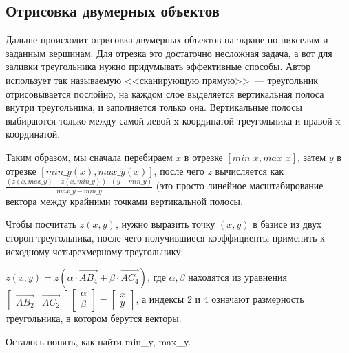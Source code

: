 \documentclass{article}
\begin{document}
\subsection{Отрисовка двумерных объектов}
Дальше происходит отрисовка двумерных объектов на экране по пикселям и заданным вершинам. Для отрезка это достаточно несложная задача, а вот для заливки треугольника нужно придумывать эффективные способы. Автор использует так называемую <<сканирующую прямую>>~--- треугольник отрисовывается послойно, на каждом слое выделяется вертикальная полоса внутри треугольника, и заполняется только она. Вертикальные полосы выбираются только между самой левой x-координатой треугольника и правой x-координатой.

Таким образом, мы сначала перебираем $x$ в отрезке $[min\_x, max\_x]$, затем $y$ в отрезке $[min\_y(x), max\_y(x)]$, после чего $z$ вычисляется как $\frac{(z(x, max\_y) - z(x, min\_y)) \cdot (y - min\_y)}{max\_y - min\_y}$ (это просто линейное масштабирование вектора между крайними точками вертикальной полосы.

Чтобы посчитать $z(x, y)$, нужно выразить точку $(x, y)$ в базисе из двух сторон треугольника, после чего получившиеся коэффициенты применить к исходному четырехмерному треугольнику:

$z(x, y) = z(\alpha \cdot \vec{AB_4} + \beta \cdot \vec{AC_4})$, где $\alpha, \beta$ находятся из уравнения $\begin{bmatrix}\vec{AB_2} & \vec{AC_2} \end{bmatrix} \begin{bmatrix} \alpha \\ \beta \end{bmatrix} = \begin{bmatrix} x \\ y \end{bmatrix}$, а индексы 2 и 4 означают размерность треугольника, в котором берутся векторы.


Осталось понять, как найти min\_y, max\_y.
\end{document}
